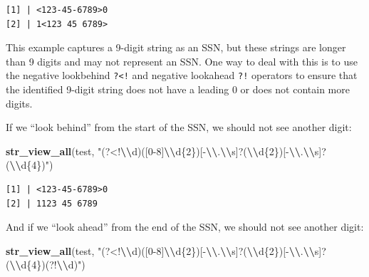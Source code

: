 \documentclass[
]{book}
\newenvironment{Shaded}{\begin{snugshade}}{\end{snugshade}}
\newcommand{\FunctionTok}[1]{\textcolor[rgb]{0.13,0.29,0.53}{\textbf{#1}}}
\newcommand{\NormalTok}[1]{#1}
\newcommand{\SpecialCharTok}[1]{\textcolor[rgb]{0.81,0.36,0.00}{\textbf{#1}}}
\newcommand{\StringTok}[1]{\textcolor[rgb]{0.31,0.60,0.02}{#1}}
\begin{document}
\begin{verbatim}
[1] | <123-45-6789>0
[2] | 1<123 45 6789>
\end{verbatim}

This example captures a 9-digit string as an SSN, but these strings are longer than 9 digits and may not represent an SSN. One way to deal with this is to use the negative lookbehind \texttt{?\textless{}!} and negative lookahead \texttt{?!} operators to ensure that the identified 9-digit string does not have a leading 0 or does not contain more digits.

If we ``look behind'' from the start of the SSN, we should not see another digit:

\begin{Shaded}
\begin{Highlighting}[]
\FunctionTok{str\_view\_all}\NormalTok{(test, }\StringTok{"(?\textless{}!}\SpecialCharTok{\textbackslash{}\textbackslash{}}\StringTok{d)([0{-}8]}\SpecialCharTok{\textbackslash{}\textbackslash{}}\StringTok{d\{2\})[{-}}\SpecialCharTok{\textbackslash{}\textbackslash{}}\StringTok{.}\SpecialCharTok{\textbackslash{}\textbackslash{}}\StringTok{s]?(}\SpecialCharTok{\textbackslash{}\textbackslash{}}\StringTok{d\{2\})[{-}}\SpecialCharTok{\textbackslash{}\textbackslash{}}\StringTok{.}\SpecialCharTok{\textbackslash{}\textbackslash{}}\StringTok{s]?(}\SpecialCharTok{\textbackslash{}\textbackslash{}}\StringTok{d\{4\})"}\NormalTok{)}
\end{Highlighting}
\end{Shaded}

\begin{verbatim}
[1] | <123-45-6789>0
[2] | 1123 45 6789
\end{verbatim}

And if we ``look ahead'' from the end of the SSN, we should not see another digit:

\begin{Shaded}
\begin{Highlighting}[]
\FunctionTok{str\_view\_all}\NormalTok{(test, }\StringTok{"(?\textless{}!}\SpecialCharTok{\textbackslash{}\textbackslash{}}\StringTok{d)([0{-}8]}\SpecialCharTok{\textbackslash{}\textbackslash{}}\StringTok{d\{2\})[{-}}\SpecialCharTok{\textbackslash{}\textbackslash{}}\StringTok{.}\SpecialCharTok{\textbackslash{}\textbackslash{}}\StringTok{s]?(}\SpecialCharTok{\textbackslash{}\textbackslash{}}\StringTok{d\{2\})[{-}}\SpecialCharTok{\textbackslash{}\textbackslash{}}\StringTok{.}\SpecialCharTok{\textbackslash{}\textbackslash{}}\StringTok{s]?(}\SpecialCharTok{\textbackslash{}\textbackslash{}}\StringTok{d\{4\})(?!}\SpecialCharTok{\textbackslash{}\textbackslash{}}\StringTok{d)"}\NormalTok{)}
\end{Highlighting}
\end{Shaded}
\end{document}
